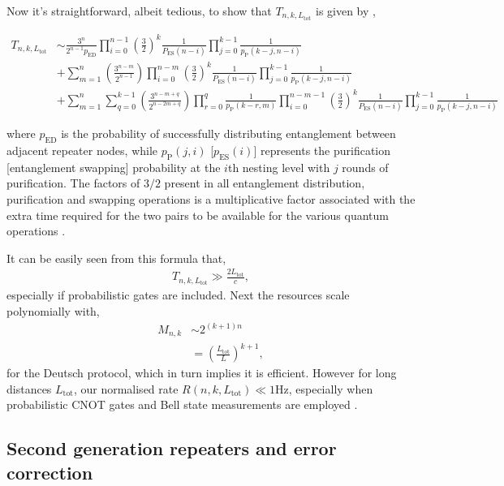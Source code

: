 Now it's straightforward, albeit tedious, to show that $T_{n,k,L_\mathrm{tot}}$ is given by \cite{bib:braztzik2013},
\begin{widetext}
\begin{align*}
 T_{n,k,L_\mathrm{tot}} &\sim \frac{3^n}{2^{n-1} p_\mathrm{ED}} \prod_{i=0}^{n-1} \left(\frac{3}{2}\right)^{k}  \frac{1}{P_\mathrm{ES}(n-i)  }\prod_{j=0}^{k-1} \frac{1}{p_\mathrm{P}(k-j,n-i)}  \nonumber \\
 &+\sum_{m=1}^n\left(\frac{3^{n-m}}{2^{n-1}}\right) \prod_{i=0}^{n-m}   \left(\frac{3}{2}\right)^{k} \frac{1}{P_\mathrm{ES}(n-i)}  \prod_{j=0}^{k-1}  \frac{1}{p_\mathrm{P}(k-j,n-i)}  \\
&+\sum_{m=1}^n {\sum_{q=0}^{k-1} \left(\frac{3^{n-m+q}}{2^{n- 2 m+q}}\right) \prod_{r=0}^{q}\frac{1}{p_\mathrm{P}(k-r,m)}} 
\prod_{i=0}^{n-m-1}   \left(\frac{3}{2}\right)^{k} \frac{1}{P_\mathrm{ES}(n-i)}  \prod_{j=0}^{k-1}  \frac{1}{p_\mathrm{P}(k-j,n-i)} \nonumber 
\end{align*}
\end{widetext}
where $p_\mathrm{ED}$ is the probability of successfully distributing entanglement between adjacent repeater nodes, while $p_\mathrm{P}(j,i)$ [$p_\mathrm{ES}(i)$] represents the purification [entanglement swapping] probability at the $i$th nesting level with $j$ rounds of purification. The factors of $3/2$ present in all entanglement distribution, purification and swapping operations is a multiplicative factor associated with the extra time required for the two pairs to be available for the various quantum operations \cite{bib:SSRG09}.

It can be easily seen from this formula that,
\begin{align}
	T_{n,k,L_\mathrm{tot}} \gg \frac{2 L_\mathrm{tot}}{c},
\end{align}
especially if probabilistic gates are included. Next the resources scale polynomially with,
\begin{align}
	M_{n,k} &\sim 2^{(k+1)n}\nonumber\\
	&= \left(\frac{L_\mathrm{tot}}{L}\right)^{k+1},
\end{align}
for the Deutsch protocol, which in turn implies it is efficient. However for long distances $L_\mathrm{tot}$, our normalised rate \mbox{$R(n,k,L_\mathrm{tot})\ll 1\mathrm{Hz}$}, especially when probabilistic CNOT gates and Bell state measurements are employed \cite{bib:jiang09, bib:munro10}.

\subsection{Second generation repeaters and error correction}

